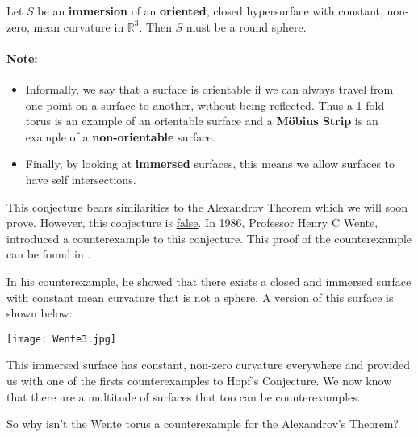 \documentclass[a4paper,12pt]{report}
\begin{document}
\begin{proposition}
Let $S$ be an \textbf{immersion} of an \textbf{oriented}, closed hypersurface with constant, non-zero, mean curvature in $\mathbb{R}^{3}$. Then $S$ must be a round sphere.
\end{proposition}

\paragraph{Note:} 
\begin{itemize}
\item Informally, we say that a surface is orientable if we can always travel from one point on a surface to another, without being reflected. Thus a 1-fold torus is an example of an orientable surface and a \textbf{M{\"o}bius Strip} is an example of a \textbf{non-orientable} surface. 
\item Finally, by looking at \textbf{immersed}  surfaces, this means we allow surfaces to have self intersections.
\end{itemize}

\hspace{-0.7cm}This conjecture bears similarities to the Alexandrov Theorem which we will soon prove. However, this conjecture is \underline{false}. In 1986, Professor Henry C Wente, introduced a counterexample to this conjecture. This proof of the counterexample can be found in \cite{wente}.\par 
In his counterexample, he showed that there exists a closed and immersed surface with constant mean curvature that is not a sphere. A version of this surface is shown below:

\begin{center}
\texttt{[image: Wente3.jpg]}
\end{center}

\hspace{-0.7cm}This immersed surface has constant, non-zero curvature everywhere and provided us with one of the firsts counterexamples to Hopf's Conjecture. We now know that there are a multitude of surfaces that too can be counterexamples.\newline

\hspace{-0.7cm}So why isn't the Wente torus a counterexample for the Alexandrov's Theorem?\newline
\end{document}
